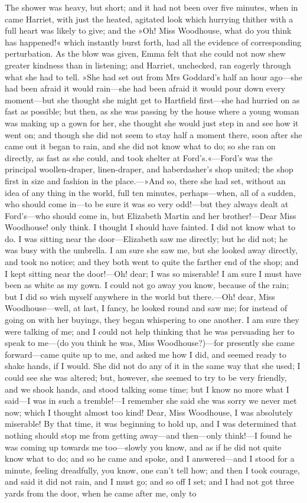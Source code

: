 The shower was heavy, but short; and it had not been over five minutes, when in came Harriet, with just the heated, agitated look which hurrying thither with a full heart was likely to give; and the »Oh! Miss Woodhouse, what do you think has happened!« which instantly burst forth, had all the evidence of corresponding perturbation. As the blow was given, Emma felt that she could not now shew greater kindness than in listening; and Harriet, unchecked, ran eagerly through what she had to tell. »She had set out from Mrs Goddard's half an hour ago—she had been afraid it would rain—she had been afraid it would pour down every moment—but she thought she might get to Hartfield first—she had hurried on as fast as possible; but then, as she was passing by the house where a young woman was making up a gown for her, she thought she would just step in and see how it went on; and though she did not seem to stay half a moment there, soon after she came out it began to rain, and she did not know what to do; so she ran on directly, as fast as she could, and took shelter at Ford's.«—Ford's was the principal woollen-draper, linen-draper, and haberdasher's shop united; the shop first in size and fashion in the place.—»And so, there she had set, without an idea of any thing in the world, full ten minutes, perhaps—when, all of a sudden, who should come in—to be sure it was so very odd!—but they always dealt at Ford's—who should come in, but Elizabeth Martin and her brother!—Dear Miss Woodhouse! only think. I thought I should have fainted. I did not know what to do. I was sitting near the door—Elizabeth saw me directly; but he did not; he was busy with the umbrella. I am sure she saw me, but she looked away directly, and took no notice; and they both went to quite the farther end of the shop; and I kept sitting near the door!—Oh! dear; I was so miserable! I am sure I must have been as white as my gown. I could not go away you know, because of the rain; but I did so wish myself anywhere in the world but there.—Oh! dear, Miss Woodhouse—well, at last, I fancy, he looked round and saw me; for instead of going on with her buyings, they began whispering to one another. I am sure they were talking of me; and I could not help thinking that he was persuading her to speak to me—(do you think he was, Miss Woodhouse?)—for presently she came forward—came quite up to me, and asked me how I did, and seemed ready to shake hands, if I would. She did not do any of it in the same way that she used; I could see she was altered; but, however, she seemed to try to be very friendly, and we shook hands, and stood talking some time; but I know no more what I said—I was in such a tremble!—I remember she said she was sorry we never met now; which I thought almost too kind! Dear, Miss Woodhouse, I was absolutely miserable! By that time, it was beginning to hold up, and I was determined that nothing should stop me from getting away—and then—only think!—I found he was coming up towards me too—slowly you know, and as if he did not quite know what to do; and so he came and spoke, and I answered—and I stood for a minute, feeling dreadfully, you know, one can't tell how; and then I took courage, and said it did not rain, and I must go; and so off I set; and I had not got three yards from the door, when he came after me, only to 